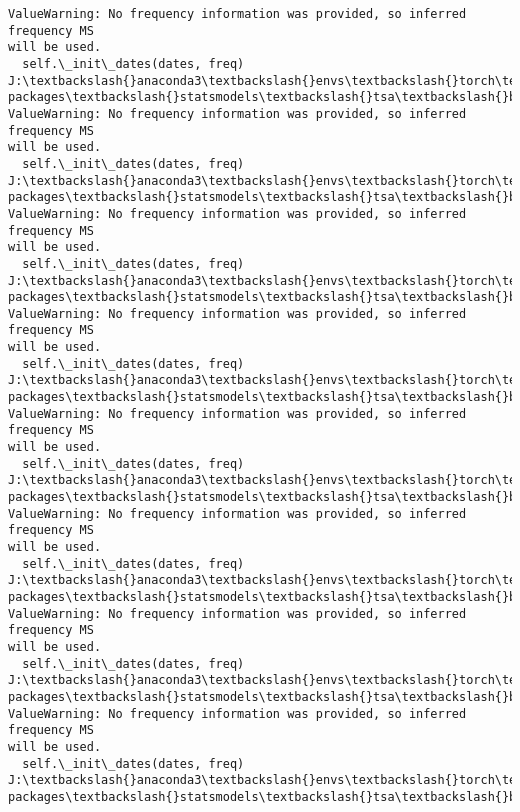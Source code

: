 \documentclass[11pt]{article}
\begin{document}
\begin{Verbatim}[commandchars=\\\{\}]
ValueWarning: No frequency information was provided, so inferred frequency MS
will be used.
  self.\_init\_dates(dates, freq)
J:\textbackslash{}anaconda3\textbackslash{}envs\textbackslash{}torch\textbackslash{}Lib\textbackslash{}site-packages\textbackslash{}statsmodels\textbackslash{}tsa\textbackslash{}base\textbackslash{}tsa\_model.py:473:
ValueWarning: No frequency information was provided, so inferred frequency MS
will be used.
  self.\_init\_dates(dates, freq)
J:\textbackslash{}anaconda3\textbackslash{}envs\textbackslash{}torch\textbackslash{}Lib\textbackslash{}site-packages\textbackslash{}statsmodels\textbackslash{}tsa\textbackslash{}base\textbackslash{}tsa\_model.py:473:
ValueWarning: No frequency information was provided, so inferred frequency MS
will be used.
  self.\_init\_dates(dates, freq)
J:\textbackslash{}anaconda3\textbackslash{}envs\textbackslash{}torch\textbackslash{}Lib\textbackslash{}site-packages\textbackslash{}statsmodels\textbackslash{}tsa\textbackslash{}base\textbackslash{}tsa\_model.py:473:
ValueWarning: No frequency information was provided, so inferred frequency MS
will be used.
  self.\_init\_dates(dates, freq)
J:\textbackslash{}anaconda3\textbackslash{}envs\textbackslash{}torch\textbackslash{}Lib\textbackslash{}site-packages\textbackslash{}statsmodels\textbackslash{}tsa\textbackslash{}base\textbackslash{}tsa\_model.py:473:
ValueWarning: No frequency information was provided, so inferred frequency MS
will be used.
  self.\_init\_dates(dates, freq)
J:\textbackslash{}anaconda3\textbackslash{}envs\textbackslash{}torch\textbackslash{}Lib\textbackslash{}site-packages\textbackslash{}statsmodels\textbackslash{}tsa\textbackslash{}base\textbackslash{}tsa\_model.py:473:
ValueWarning: No frequency information was provided, so inferred frequency MS
will be used.
  self.\_init\_dates(dates, freq)
J:\textbackslash{}anaconda3\textbackslash{}envs\textbackslash{}torch\textbackslash{}Lib\textbackslash{}site-packages\textbackslash{}statsmodels\textbackslash{}tsa\textbackslash{}base\textbackslash{}tsa\_model.py:473:
ValueWarning: No frequency information was provided, so inferred frequency MS
will be used.
  self.\_init\_dates(dates, freq)
J:\textbackslash{}anaconda3\textbackslash{}envs\textbackslash{}torch\textbackslash{}Lib\textbackslash{}site-packages\textbackslash{}statsmodels\textbackslash{}tsa\textbackslash{}base\textbackslash{}tsa\_model.py:473:
ValueWarning: No frequency information was provided, so inferred frequency MS
will be used.
  self.\_init\_dates(dates, freq)
J:\textbackslash{}anaconda3\textbackslash{}envs\textbackslash{}torch\textbackslash{}Lib\textbackslash{}site-packages\textbackslash{}statsmodels\textbackslash{}tsa\textbackslash{}base\textbackslash{}tsa\_model.py:473:

\end{Verbatim}
\end{document}
